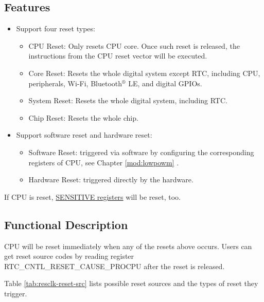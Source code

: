 \documentclass[main\_\_EN.tex]{subfiles}
\begin{document}
\subsection{Features}
\begin{itemize}
    \item Support four reset types:
    \begin{itemize}
    \item CPU Reset: Only resets CPU core. Once such reset is released, the instructions from the CPU reset vector will be executed.
    \item Core Reset: Resets the whole digital system except RTC, including CPU, peripherals, Wi-Fi, Bluetooth$^®$ LE, and digital GPIOs.
    \item System Reset: Resets the whole digital system, including RTC.
    \item Chip Reset: Resets the whole chip.
    \end{itemize}
    \item Support software reset and hardware reset:
    \begin{itemize}
        \item Software Reset: triggered via software by configuring the corresponding registers of CPU, see Chapter \ref{mod:lowpowm} \textit{}.

        \item Hardware Reset: triggered directly by the hardware.
    \end{itemize}
\end{itemize}
\begin{tiplisting}
If CPU is reset, \href{https://github.com/espressif/esp-idf/blob/master/components/soc/esp32c2/register/soc/sensitive_reg.h}{SENSITIVE registers} will be reset, too.
\end{tiplisting}

\subsection{Functional Description}
CPU will be reset immediately when any of the resets above occurs. Users can get reset source codes by reading register RTC\_CNTL\_RESET\_CAUSE\_PROCPU after the reset is released.

Table \ref{tab:resclk-reset-src} lists possible reset sources and the types of reset they trigger.
\end{document}

